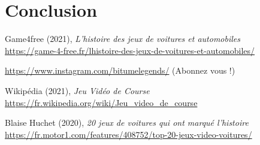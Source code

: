 \documentclass[11pt,a4paper]{article}
\begin{document}
\section{Conclusion}
\clearpage

\begin{thebibliography}{9}
  Game4free (2021), \emph{L'histoire des jeux de voitures et automobiles} \\
  \url{https://game-4-free.fr/lhistoire-des-jeux-de-voitures-et-automobiles/}

  \url{https://www.instagram.com/bitumelegends/} (Abonnez vous !)

  Wikipédia (2021), \emph{Jeu Vidéo de Course} \\
  \url{https://fr.wikipedia.org/wiki/Jeu_video_de_course}

  Blaise Huchet (2020), \emph{20 jeux de voitures qui ont marqué l'histoire}\\
  \url{https://fr.motor1.com/features/408752/top-20-jeux-video-voitures/}

  
\end{thebibliography}
\end{document}
